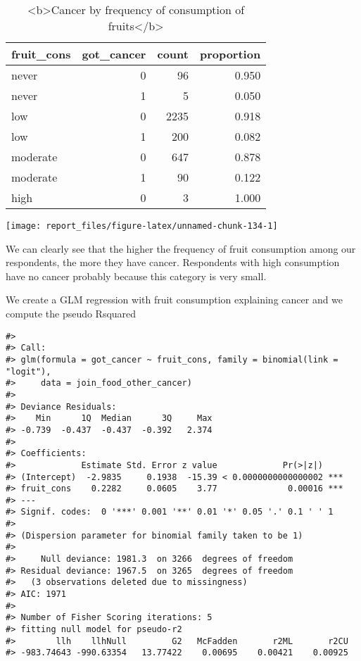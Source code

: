 \documentclass[
]{article}
\begin{document}
\begin{table}

\caption{\label{tab:unnamed-chunk-133}<b>Cancer by frequency of consumption of fruits</b>}
\centering
\begin{tabular}[t]{l|r|r|r}
\hline
fruit\_cons & got\_cancer & count & proportion\\
\hline
never & 0 & 96 & 0.950\\
\hline
never & 1 & 5 & 0.050\\
\hline
low & 0 & 2235 & 0.918\\
\hline
low & 1 & 200 & 0.082\\
\hline
moderate & 0 & 647 & 0.878\\
\hline
moderate & 1 & 90 & 0.122\\
\hline
high & 0 & 3 & 1.000\\
\hline
\end{tabular}
\end{table}

\begin{center}\texttt{[image: report\_files/figure-latex/unnamed-chunk-134-1]} \end{center}

We can clearly see that the higher the frequency of fruit consumption
among our respondents, the more they have cancer. Respondents with high
consumption have no cancer probably because this category is very small.

We create a GLM regression with fruit consumption explaining cancer and
we compute the pseudo Rsquared

\begin{verbatim}
#> 
#> Call:
#> glm(formula = got_cancer ~ fruit_cons, family = binomial(link = "logit"), 
#>     data = join_food_other_cancer)
#> 
#> Deviance Residuals: 
#>    Min      1Q  Median      3Q     Max  
#> -0.739  -0.437  -0.437  -0.392   2.374  
#> 
#> Coefficients:
#>             Estimate Std. Error z value             Pr(>|z|)    
#> (Intercept)  -2.9835     0.1938  -15.39 < 0.0000000000000002 ***
#> fruit_cons    0.2282     0.0605    3.77              0.00016 ***
#> ---
#> Signif. codes:  0 '***' 0.001 '**' 0.01 '*' 0.05 '.' 0.1 ' ' 1
#> 
#> (Dispersion parameter for binomial family taken to be 1)
#> 
#>     Null deviance: 1981.3  on 3266  degrees of freedom
#> Residual deviance: 1967.5  on 3265  degrees of freedom
#>   (3 observations deleted due to missingness)
#> AIC: 1971
#> 
#> Number of Fisher Scoring iterations: 5
#> fitting null model for pseudo-r2
#>        llh    llhNull         G2   McFadden       r2ML       r2CU 
#> -983.74643 -990.63354   13.77422    0.00695    0.00421    0.00925
\end{verbatim}
\end{document}
